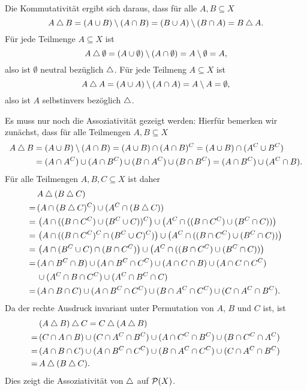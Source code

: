 Die Kommutativität ergibt sich daraus, dass für alle $A, B \subseteq X$
\[
 A \bigtriangleup B
 = (A \cup B) \setminus (A \cap B)
 = (B \cup A) \setminus (B \cap A)
 = B \bigtriangleup A.
\]
Für jede Teilmenge $A \subseteq X$ ist
\[
 A \bigtriangleup \emptyset
 = (A \cup \emptyset) \setminus (A \cap \emptyset)
 = A \setminus \emptyset
 = A,
\]
also ist $\emptyset$ neutral bezüglich $\bigtriangleup$. Für jede Teilmeng $A \subseteq X$ ist
\[
 A \bigtriangleup A
 = (A \cup A) \setminus (A \cap A)
 = A \setminus A
 = \emptyset,
\]
also ist $A$ selbstinvers bezöglich $\bigtriangleup$.

Es muss nur noch die Assoziativität gezeigt werden: Hierfür bemerken wir zunächst, dass für alle Teilmengen $A, B \subseteq X$
\begin{align*}
 A \bigtriangleup B
 &= (A \cup B) \setminus (A \cap B)
 = (A \cup B) \cap (A \cap B)^C
 = (A \cup B) \cap (A^C \cup B^C) \\
 &= (A \cap A^C) \cup (A \cap B^C) \cup (B \cap A^C) \cup (B \cap B^C)
 = (A \cap B^C) \cup (A^C \cap B).
\end{align*}
Für alle Teilmengen $A, B, C \subseteq X$ ist daher
\begin{align*}
  &\, A \bigtriangleup (B \bigtriangleup C) \\
 =&\, (A \cap (B \bigtriangleup C)^C) \cup (A^C \cap (B \bigtriangleup C)) \\
 =&\, \left( A \cap ((B \cap C^C) \cup (B^C \cup C))^C \right)
      \cup \left( A^C \cap ((B \cap C^C) \cup (B^C \cap C)) \right) \\
 =&\, \left( A \cap ((B \cap C^C)^C \cap (B^C \cup C)^C) \right)
      \cup \left( A^C \cap ((B \cap C^C) \cup (B^C \cap C)) \right) \\
 =&\, \left( A \cap (B^C \cup C) \cap (B \cap C^C) \right)
      \cup \left( A^C \cap ((B \cap C^C) \cup (B^C \cap C)) \right) \\
 =&\, (A \cap B^C \cap B) \cup (A \cap B^C \cap C^C) \cup (A \cap C \cap B) \cup (A \cap C \cap C^C) \\
  &\, \cup (A^C \cap B \cap C^C) \cup (A^C \cap B^C \cap C) \\
 =&\, (A \cap B \cap C) \cup (A \cap B^C \cap C^C) \cup (B \cap A^C \cap C^C) \cup (C \cap A^C \cap B^C).
\end{align*}
Da der rechte Ausdruck invariant unter Permutation von $A$, $B$ und $C$ ist, ist
\begin{align*}
  &\, (A \bigtriangleup B) \bigtriangleup C
 =    C \bigtriangleup (A \bigtriangleup B) \\
 =&\, (C \cap A \cap B) \cup (C \cap A^C \cap B^C) \cup (A \cap C^C \cap B^C) \cup (B \cap C^C \cap A^C) \\
 =&\, (A \cap B \cap C) \cup (A \cap B^C \cap C^C) \cup (B \cap A^C \cap C^C) \cup (C \cap A^C \cap B^C) \\
 =&\, A \bigtriangleup (B \bigtriangleup C).
\end{align*}
Dies zeigt die Assoziativität von $\bigtriangleup$ auf $\mathcal{P}(X)$.

